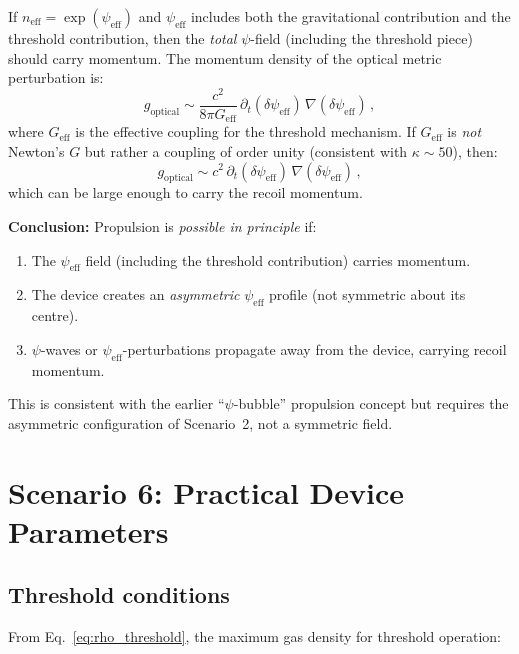 \documentclass[12pt,a4paper]{article}
\newcommand{\psieff}{\psi_{\mathrm{eff}}}
\newcommand{\neff}{n_{\mathrm{eff}}}
\begin{document}
If $\neff = \exp(\psieff)$ and $\psieff$ includes both the gravitational contribution and the threshold
contribution, then the \emph{total} $\psi$-field (including the threshold piece) should carry momentum.
The momentum density of the optical metric perturbation is:
\begin{equation}
g_{\text{optical}} \sim \frac{c^2}{8\pi G_{\text{eff}}}\,\partial_t(\delta\psieff)\,\nabla(\delta\psieff)\,,
\end{equation}
where $G_{\text{eff}}$ is the effective coupling for the threshold mechanism. If $G_{\text{eff}}$ is
\emph{not} Newton's $G$ but rather a coupling of order unity (consistent with $\kappa \sim 50$), then:
\begin{equation}
g_{\text{optical}} \sim c^2\,\partial_t(\delta\psieff)\,\nabla(\delta\psieff)\,,
\end{equation}
which can be large enough to carry the recoil momentum.

\textbf{Conclusion:} Propulsion is \emph{possible in principle} if:
\begin{enumerate}
\item The $\psieff$ field (including the threshold contribution) carries momentum.
\item The device creates an \emph{asymmetric} $\psieff$ profile (not symmetric about its centre).
\item $\psi$-waves or $\psieff$-perturbations propagate away from the device, carrying recoil momentum.
\end{enumerate}

This is consistent with the earlier ``$\psi$-bubble'' propulsion concept but requires the asymmetric
configuration of Scenario~2, not a symmetric field.

\section{Scenario 6: Practical Device Parameters}
\label{sec:scenario6}

\subsection{Threshold conditions}

From Eq.~\eqref{eq:rho_threshold}, the maximum gas density for threshold operation:
\end{document}
